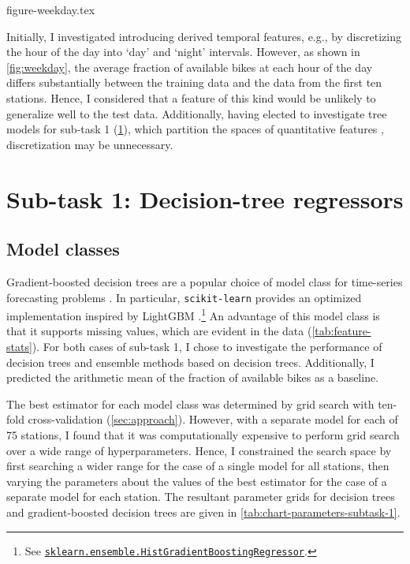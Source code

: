\documentclass[11pt]{extarticle}
\newcommand{\sklearn}[2]{\href{https://scikit-learn.org/stable/modules/generated/sklearn.#1.#2.html}{\lstinline|sklearn.#1.#2|}}
\begin{document}
{figure-weekday.tex}

Initially, I investigated introducing derived temporal features, e.g., by discretizing
the hour of the day into `day' and `night' intervals.
However, as shown in \cref{fig:weekday}, the average fraction of available bikes at
each hour of the day differs substantially between the training data and the data from
the first ten stations.
Hence, I considered that a feature of this kind would be unlikely to generalize well to
the test data.
Additionally, having elected to investigate tree models for sub-task 1
(\cref{sec:results-subtask-1}), which partition the spaces of quantitative features
\parencite[155]{Flach2012}, discretization may be unnecessary.

\section{Sub-task 1: Decision-tree regressors}
\label{sec:results-subtask-1}

\subsection{Model classes}

Gradient-boosted decision trees are a popular choice of model class for time-series
forecasting problems \parencite{Bojer2021}.
In particular, \texttt{scikit-learn} provides an optimized implementation inspired by
LightGBM \parencite{Ke2017}.\footnote{See
  \sklearn{ensemble}{HistGradientBoostingRegressor}.
}
An advantage of this model class is that it supports missing values, which are evident
in the data (\cref{tab:feature-stats}).
For both cases of sub-task 1, I chose to investigate the performance of decision trees
and ensemble methods based on decision trees.
Additionally, I predicted the arithmetic mean of the fraction of available bikes as a
baseline.

The best estimator for each model class was determined by grid search with ten-fold
cross-validation (\cref{sec:approach}).
However, with a separate model for each of 75 stations, I found that it was
computationally expensive to perform grid search over a wide range of hyperparameters.
Hence, I constrained the search space by first searching a wider range for the case of
a single model for all stations, then varying the parameters about the values of the
best estimator for the case of a separate model for each station.
The resultant parameter grids for decision trees and gradient-boosted decision trees
are given in \cref{tab:chart-parameters-subtask-1}.
\end{document}
